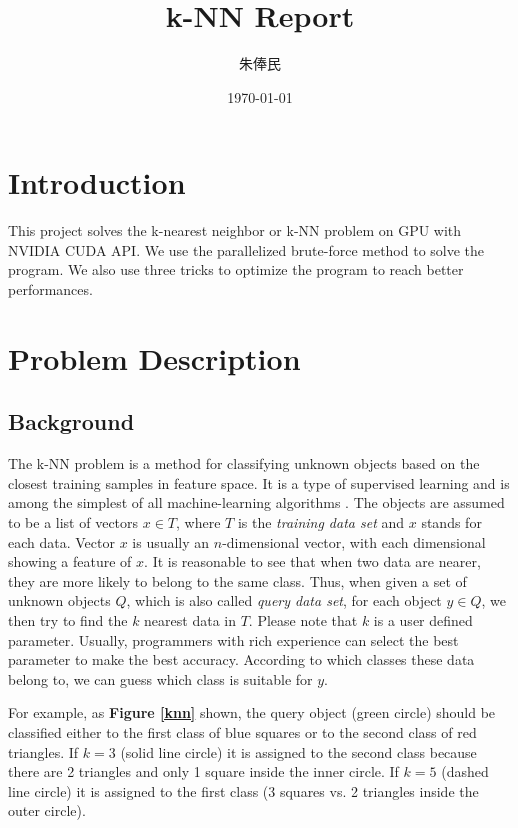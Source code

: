 \documentclass[11pt, a4paper]{article}
\title{\textbf{k-NN Report}}
\author{\kai 朱俸民}
\date{\today}
\newcommand{\fref}[1]{\textbf{Figure \ref{#1}}}
\begin{document}
\maketitle

\section{Introduction}

This project solves the k-nearest neighbor or k-NN problem on GPU with NVIDIA CUDA API. We use the parallelized brute-force method to solve the program. We also use three tricks to optimize the program to reach better performances.

\section{Problem Description}

\subsection{Background}

The k-NN problem is a method for classifying unknown objects based on the closest training samples in feature space. It is a type of supervised learning and is among the simplest of all machine-learning algorithms \cite{1}. The objects are assumed to be a list of vectors $x \in T$, where $T$ is the \textit{training data set} and $x$ stands for each data. Vector $x$ is usually an $n$-dimensional vector, with each dimensional showing a feature of $x$. It is reasonable to see that when two data are nearer, they are more likely to belong to the same class. Thus, when given a set of unknown objects $Q$, which is also called \textit{query data set}, for each object $y \in Q$, we then try to find the $k$ nearest data in $T$. Please note that $k$ is a user defined parameter. Usually, programmers with rich experience can select the best parameter to make the best accuracy. According to which classes these data belong to, we can guess which class is suitable for $y$. 

For example, as \fref{knn} shown, the query object (green circle) should be classified either to the first class of blue squares or to the second class of red triangles. If $k = 3$ (solid line circle) it is assigned to the second class because there are 2 triangles and only 1 square inside the inner circle. If $k = 5$ (dashed line circle) it is assigned to the first class (3 squares vs. 2 triangles inside the outer circle).
\end{document}
